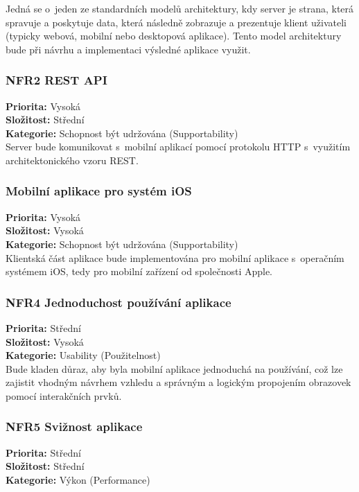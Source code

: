 \documentclass[thesis=M,czech]{FITthesis}[2019/12/23]
\begin{document}
Jedná se o~jeden ze standardních modelů architektury, kdy server je strana, která spravuje a poskytuje data, která následně zobrazuje a prezentuje klient uživateli (typicky webová, mobilní nebo desktopová aplikace). Tento model architektury bude při návrhu a implementaci výsledné aplikace využit.

\subsubsection*{NFR2 REST API}
\textbf{Priorita:} Vysoká \\
\textbf{Složitost:} Střední \\
\textbf{Kategorie:} Schopnost být udržována (Supportability) \\

Server bude komunikovat s~mobilní aplikací pomocí protokolu HTTP s~využitím architektonického vzoru REST.

\subsubsection*{Mobilní aplikace pro systém iOS}
\textbf{Priorita:} Vysoká \\
\textbf{Složitost:} Vysoká \\
\textbf{Kategorie:} Schopnost být udržována (Supportability) \\

Klientská část aplikace bude implementována pro mobilní aplikace s~operačním systémem iOS, tedy pro mobilní zařízení od společnosti Apple.

\subsubsection*{NFR4 Jednoduchost používání aplikace}
\textbf{Priorita:} Střední \\
\textbf{Složitost:} Vysoká \\
\textbf{Kategorie:} Usability (Použitelnost) \\

Bude kladen důraz, aby byla mobilní aplikace jednoduchá na používání, což lze zajistit vhodným návrhem vzhledu a správným a logickým propojením obrazovek pomocí interakčních prvků.

\subsubsection*{NFR5 Svižnost aplikace}
\textbf{Priorita:} Střední \\
\textbf{Složitost:} Střední\\
\textbf{Kategorie:} Výkon (Performance) \\
\end{document}
